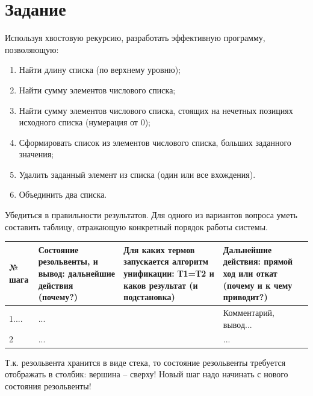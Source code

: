 \section{Задание}

Используя хвостовую рекурсию, разработать эффективную программу, позволяющую:
\begin{enumerate}
	\item Найти длину списка (по верхнему уровню);
	\item Найти сумму элементов числового списка;
	\item Найти сумму элементов числового списка, стоящих на нечетных позициях исходного
	      списка (нумерация от 0);
	\item Сформировать список из элементов числового списка, больших заданного значения;
	\item Удалить заданный элемент из списка (один или все вхождения).
	\item Объединить два списка.
\end{enumerate}

Убедиться в правильности результатов.
Для одного из вариантов вопроса уметь составить таблицу, отражающую конкретный
порядок работы системы.

\begin{tabularx}{\textwidth}{|p{1.1cm}|X|X|X|}
	\hline
	№ шага & Состояние резольвенты, и вывод: дальнейшие действия (почему?) & Для каких термов запускается алгоритм унификации: Т1=Т2 и каков результат (и подстановка) & Дальнейшие действия: прямой ход или откат (почему и к чему приводит?) \\
	\hline
	1....  & ...                                                           &                                                                                           & Комментарий, вывод...                                                 \\
	\hline
	2      & ...                                                           &                                                                                           & ...                                                                   \\
	\hline
\end{tabularx}

Т.к. резольвента хранится в виде стека, то состояние резольвенты требуется отображать в столбик: вершина -- сверху! Новый шаг надо начинать с нового состояния резольвенты!
